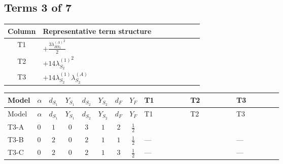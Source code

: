 \documentclass[8pt]{article}
\begin{document}
\begin{landscape}
\subsection*{Terms 3 of 7}
\begin{center}
\begin{tabular}{@{}c >{\raggedright\arraybackslash}p{0.82\linewidth}@{}}
\toprule
Column & Representative term structure \\
\midrule
T1 & \(\displaystyle +\frac{3 {\lambda_{HS_2}^{(A)}}^2}{2}\) \\
\midrule
T2 & \(\displaystyle +14 {\lambda_{S_2}^{(1)}}^2\) \\
\midrule
T3 & \(\displaystyle +14 {\lambda_{S_2}^{(1)}} {\lambda_{S_2}^{(A)}}\) \\
\midrule
\bottomrule
\end{tabular}
\end{center}
\smallskip
\tiny
\begin{longtable}{@{}llcccccc >{\raggedright\arraybackslash}p{0.21\linewidth} >{\raggedright\arraybackslash}p{0.21\linewidth} >{\raggedright\arraybackslash}p{0.21\linewidth}@{}}
\toprule
Model & $\alpha$ & $d_{S_1}$ & $Y_{S_1}$ & $d_{S_2}$ & $Y_{S_2}$ & $d_F$ & $Y_F$ & T1 & T2 & T3 \\
\midrule
\endfirsthead
\toprule
Model & $\alpha$ & $d_{S_1}$ & $Y_{S_1}$ & $d_{S_2}$ & $Y_{S_2}$ & $d_F$ & $Y_F$ & T1 & T2 & T3 \\
\midrule
\endhead
T3-A & $0$ & $1$ & $0$ & $3$ & $1$ & $2$ & $\frac{1}{2}$ & \scriptsize\adjustbox{max width=\linewidth}{$\begin{gathered} +\frac{3 {\lambda_{HS_2}^{(A)}}^2}{2}\end{gathered}$} & \scriptsize\adjustbox{max width=\linewidth}{$\begin{gathered} +14 {\lambda_{S_2}^{(1)}}^2\end{gathered}$} & \scriptsize\adjustbox{max width=\linewidth}{$\begin{gathered} +14 {\lambda_{S_2}^{(1)}} {\lambda_{S_2}^{(A)}}\end{gathered}$} \\
\midrule
T3-B & $0$ & $2$ & $0$ & $2$ & $1$ & $1$ & $\frac{1}{2}$ & --- & \scriptsize\adjustbox{max width=\linewidth}{$\begin{gathered} +12 {\lambda_{S_2}^{(1)}}^2\end{gathered}$} & --- \\
\midrule
T3-C & $0$ & $2$ & $0$ & $2$ & $1$ & $3$ & $\frac{1}{2}$ & --- & \scriptsize\adjustbox{max width=\linewidth}{$\begin{gathered} +12 {\lambda_{S_2}^{(1)}}^2\end{gathered}$} & --- \\

\end{longtable}
\end{landscape}
\end{document}
